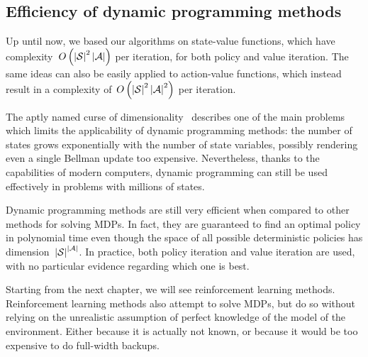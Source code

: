 \subsection{Efficiency of dynamic programming methods}
Up until now, we based our algorithms on state-value functions, which have complexity~${O\left(\left\lvert\mathcal{S}\right\rvert^{2}\left\lvert\mathcal{A}\right\rvert\right)}$ per iteration, for both policy and value iteration. The same ideas can also be easily applied to action-value functions, which instead result in a complexity of~${O\left(\left\lvert\mathcal{S}\right\rvert^{2}\left\lvert\mathcal{A}\right\rvert^{2}\right)}$ per iteration.

The aptly named curse of dimensionality~\cite{bellman1957dynamic} describes one of the main problems which limits the applicability of dynamic programming methods: the number of states grows exponentially with the number of state variables, possibly rendering even a single Bellman update too expensive. Nevertheless, thanks to the capabilities of modern computers, dynamic programming can still be used effectively in problems with millions of states.

Dynamic programming methods are still very efficient when compared to other methods for solving MDPs. In fact, they are guaranteed to find an optimal policy in polynomial time even though the space of all possible deterministic policies has dimension~${\left\lvert\mathcal{S}\right\rvert^{\left\lvert\mathcal{A}\right\rvert}}$. In practice, both policy iteration and value iteration are used, with no particular evidence regarding which one is best.

Starting from the next chapter, we will see reinforcement learning methods. Reinforcement learning methods also attempt to solve MDPs, but do so without relying on the unrealistic assumption of perfect knowledge of the model of the environment. Either because it is actually not known, or because it would be too expensive to do full-width backups.
